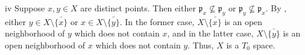 \begin{partsolution}{iv}
Suppose \(x, y \in X\) are distinct points.
Then either \(\mathfrak{p}_x \not\subseteq \mathfrak{p}_y\) or \(\mathfrak{p}_y \not\subseteq \mathfrak{p}_x\).
By , either \(y \in X \setminus \bar{\{x\}}\) or \(x \in X \setminus \bar{\{y\}}\).
In the former case, \(X \setminus \bar{\{x\}}\) is an open neighborhood of \(y\) which does not contain \(x\), and in the latter case, \(X \setminus \bar{\{y\}}\) is an open neighborhood of \(x\) which does not contain \(y\).
Thus, \(X\) is a \(T_0\) space.
\end{partsolution}